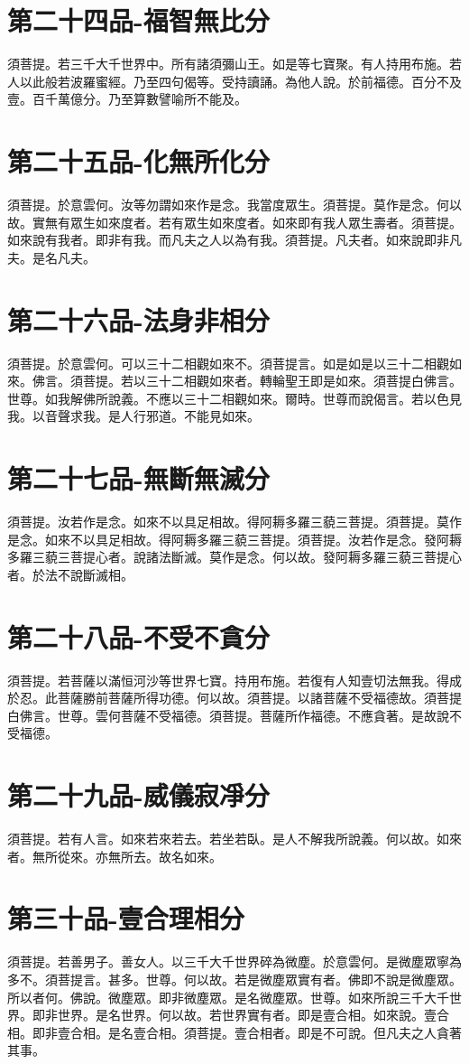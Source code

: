 \documentclass[a6paper, 22pt, twocolumn]{cvertbook}
\begin{document}
\chapter{第二十四品-福智無比分}
須菩提。若三千大千世界中。所有諸須彌山王。如是等七寶聚。有人持用布施。若人以此般若波羅蜜經。乃至四句偈等。受持讀誦。為他人說。於前福德。百分不及壹。百千萬億分。乃至算數譬喻所不能及。
\chapter{第二十五品-化無所化分}
須菩提。於意雲何。汝等勿謂如來作是念。我當度眾生。須菩提。莫作是念。何以故。實無有眾生如來度者。若有眾生如來度者。如來即有我人眾生壽者。須菩提。如來說有我者。即非有我。而凡夫之人以為有我。須菩提。凡夫者。如來說即非凡夫。是名凡夫。
\chapter{第二十六品-法身非相分}
須菩提。於意雲何。可以三十二相觀如來不。須菩提言。如是如是以三十二相觀如來。佛言。須菩提。若以三十二相觀如來者。轉輪聖王即是如來。須菩提白佛言。世尊。如我解佛所說義。不應以三十二相觀如來。爾時。世尊而說偈言。若以色見我。以音聲求我。是人行邪道。不能見如來。
\chapter{第二十七品-無斷無滅分}
須菩提。汝若作是念。如來不以具足相故。得阿耨多羅三藐三菩提。須菩提。莫作是念。如來不以具足相故。得阿耨多羅三藐三菩提。須菩提。汝若作是念。發阿耨多羅三藐三菩提心者。說諸法斷滅。莫作是念。何以故。發阿耨多羅三藐三菩提心者。於法不說斷滅相。
\chapter{第二十八品-不受不貪分}
須菩提。若菩薩以滿恒河沙等世界七寶。持用布施。若復有人知壹切法無我。得成於忍。此菩薩勝前菩薩所得功德。何以故。須菩提。以諸菩薩不受福德故。須菩提白佛言。世尊。雲何菩薩不受福德。須菩提。菩薩所作福德。不應貪著。是故說不受福德。
\chapter{第二十九品-威儀寂凈分}
須菩提。若有人言。如來若來若去。若坐若臥。是人不解我所說義。何以故。如來者。無所從來。亦無所去。故名如來。
\chapter{第三十品-壹合理相分}
須菩提。若善男子。善女人。以三千大千世界碎為微塵。於意雲何。是微塵眾寧為多不。須菩提言。甚多。世尊。何以故。若是微塵眾實有者。佛即不說是微塵眾。所以者何。佛說。微塵眾。即非微塵眾。是名微塵眾。世尊。如來所說三千大千世界。即非世界。是名世界。何以故。若世界實有者。即是壹合相。如來說。壹合相。即非壹合相。是名壹合相。須菩提。壹合相者。即是不可說。但凡夫之人貪著其事。
\end{document}
